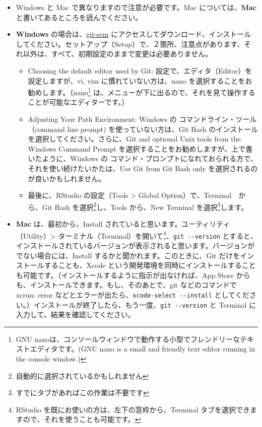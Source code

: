 \documentclass[
]{bxjsbook}
\providecommand{\tightlist}{%
  \setlength{\itemsep}{0pt}\setlength{\parskip}{0pt}}
\theoremstyle{definition}
\theoremstyle{definition}
\theoremstyle{definition}
\theoremstyle{definition}
\theoremstyle{remark}
\begin{document}
\begin{itemize}
\tightlist
\item
  Windows と Mac で異なりますので注意が必要です。Mac については、\textbf{Mac} と書いてあるところを読んでください。
\item
  \textbf{Windows} の場合は、\href{https://git-scm.com/download/win}{git-scm} にアクセスしてダウンロード、インストールしてください。セットアップ（Setup）で、２箇所、注意点があります、それ以外は、すべて、初期設定のままで変更は必要ありません。

  \begin{itemize}
  \tightlist
  \item
    Choosing the default editor used by Git: 設定で、エディタ（Editor）を設定しますが、vi, vim に慣れていない方は、nano を選択することをお勧めします。（nano\footnote{GNU nanoは、コンソールウィンドウで動作する小型でフレンドリーなテキストエディタです。(GNU nano is a small and friendly text editor running in the console window.)} は、メニューが下に出るので、それを見て操作することが可能なエディターです。）
  \item
    Adjusting Your Path Environment: Windows の コマンドライン・ツール（command line prompt) を使っていない方は、Git Bash のインストールを選択してください。さらに、Git and optional Unix tools from the Windows Command Prompt を選択することをお勧めしますが、上で書いたように、Windows の コマンド・プロンプトになれておられる方で、それを使い続けたいかたは、Use Git from Git Bash only を選択されるのが良いかもしれません。
  \item
    最後に、RStudio の設定（Tools \textgreater{} Global Option）で、Terminal　から、Git Bash を選択\footnote{自動的に選択されているかもしれません}し、Tools から、New Terminal を選択\footnote{すでにタブがあればこの作業は不要です}します。
  \end{itemize}
\item
  \textbf{Mac} は、最初から、Install されていると思います。ユーティリティ（Utility）\textgreater{} ターミナル（Terminal）を開いて\footnote{RStudio を既にお使いの方は、左下の窓枠から、Terminal タブを選択できますので、それを使うことも可能です。}、\texttt{git\ -\/-version} とすると、インストールされているバージョンが表示されると思います。バージョンがでない場合には、Install するかと聞かれます。このときに、Git だけをインストールすることも、Xcode という開発環境を同時にインストールすることも可能です。（インストールするように指示が出なければ、App Store からも、インストールできます。もし、そのあとで、git などのコマンドで xcrun: error などとエラーが出たら、\texttt{xcode-select\ -\/-install} としてください。）インストールが終了したら、もう一度、\texttt{git\ -\/-version} と Terminal に入力して、結果を確認してください。
\end{itemize}
\end{document}
